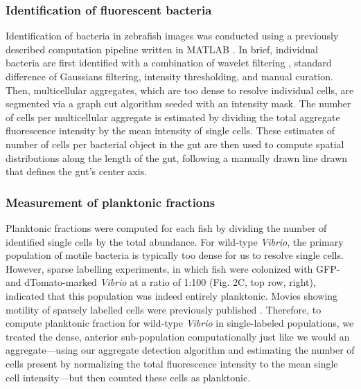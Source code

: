 {{{{{{{\subsubsection{Identification of fluorescent bacteria}
Identification of bacteria in zebrafish images was conducted using a previously described computation pipeline written in MATLAB \cite{schlomann_bacterial_2018,jemielita_spatial_2014}. In brief, individual bacteria are first identified with a combination of wavelet filtering \cite{olivo-marin_extraction_2002}, standard difference of Gaussians filtering, intensity thresholding, and manual curation. Then, multicellular aggregates, which are too dense to resolve individual cells, are segmented via a graph cut algorithm \cite{boykov_experimental_2004} seeded with an intensity mask. The number of cells per multicellular aggregate is estimated by dividing the total aggregate fluorescence intensity by the mean intensity of single cells. These estimates of number of cells per bacterial object in the gut are then used to compute spatial distributions along the length of the gut, following a manually drawn line drawn that defines the gut's center axis.

\subsubsection{Measurement of planktonic fractions}
Planktonic fractions were computed for each fish by dividing the number of identified single cells by the total abundance. For wild-type \textit{Vibrio}, the primary population of motile bacteria is typically too dense for us to resolve single cells. However, sparse labelling experiments, in which fish were colonized with GFP- and dTomato-marked \textit{Vibrio} at a ratio of 1:100 (Fig. 2C, top row, right), indicated that this population was indeed entirely planktonic. Movies showing motility of sparsely labelled cells were previously published \cite{wiles_modernized_2018,schlomann_bacterial_2018}. Therefore, to compute planktonic fraction for wild-type \textit{Vibrio} in single-labeled populations, we treated the dense, anterior sub-population computationally just like we would an aggregate—using our aggregate detection algorithm and estimating the number of cells present by normalizing the total fluorescence intensity to the mean single cell intensity—but then counted these cells as planktonic.

}}}}}}}
